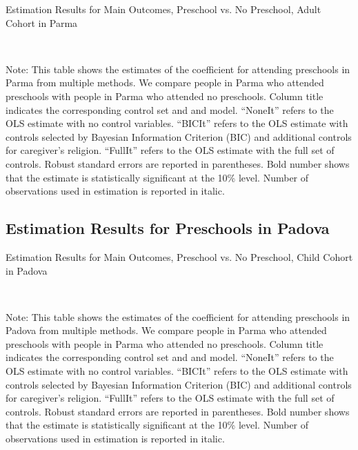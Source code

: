 \begin{table}[H] \caption{Estimation Results for Main Outcomes, Preschool vs. No Preschool, Adult Cohort in Parma} \label{ols-M-adult-reg-pres-parma}
\scalebox{0.8}{}
\vspace{1ex} \\
\footnotesize\raggedright{Note: This table shows the estimates of the coefficient for attending preschools in Parma from multiple methods. We compare people in Parma who attended preschools with people in Parma who attended no preschools. Column title indicates the corresponding control set and and model. ``NoneIt'' refers to the OLS estimate with no control variables. ``BICIt'' refers to the OLS estimate with controls selected by Bayesian Information Criterion (BIC) and additional controls for caregiver's religion. ``FullIt'' refers to the OLS estimate with the full set of controls. Robust standard errors are reported in parentheses. Bold number shows that the estimate is statistically significant at the 10\% level. Number of observations used in estimation is reported in italic.}

\end{table}









\subsection{Estimation Results for Preschools in Padova}



\begin{table}[H] \caption{Estimation Results for Main Outcomes, Preschool vs. No Preschool, Child Cohort in Padova} \label{ols-M-child-reg-pres-padova}
\scalebox{0.8}{}
\vspace{1ex} \\
\footnotesize\raggedright{Note: This table shows the estimates of the coefficient for attending preschools in Padova from multiple methods. We compare people in Parma who attended preschools with people in Parma who attended no preschools. Column title indicates the corresponding control set and and model. ``NoneIt'' refers to the OLS estimate with no control variables. ``BICIt'' refers to the OLS estimate with controls selected by Bayesian Information Criterion (BIC) and additional controls for caregiver's religion. ``FullIt'' refers to the OLS estimate with the full set of controls. Robust standard errors are reported in parentheses. Bold number shows that the estimate is statistically significant at the 10\% level. Number of observations used in estimation is reported in italic.}

\end{table}


